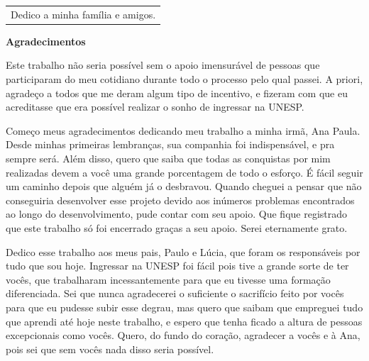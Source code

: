 \documentclass[a4paper,12pt,oneside]{report}
\begin{document}
\newpage
\thispagestyle{empty}
\vspace*{+530pt}
\hspace*{+160pt}
\begin{tabular}{p{260pt}}
  {\small Dedico a minha fam\'{i}lia e amigos.}
\end{tabular}
\newpage
\thispagestyle{empty}
\begin{center}{\LARGE \textbf{Agradecimentos}}\end{center}
\vspace{+60pt}
\hspace*{+15pt} Este trabalho n\~{a}o seria poss\'{i}vel sem o apoio imensur\'{a}vel de pessoas que participaram do meu cotidiano durante todo o processo pelo qual passei. A priori, agrade\c{c}o a todos que me deram algum tipo de incentivo, e fizeram com que eu acreditasse que era poss\'{i}vel realizar o sonho de ingressar na UNESP.
\\
\par Come\c{c}o meus agradecimentos dedicando meu trabalho a minha irm\~{a}, Ana Paula. Desde minhas primeiras lembran\c{c}as, sua companhia foi indispens\'{a}vel, e pra sempre ser\'{a}. Al\'{e}m disso, quero que saiba que todas as conquistas por mim realizadas devem a voc\^{e} uma grande porcentagem de todo o esfor\c{c}o. \'{E}  f\'{a}cil seguir um caminho depois que algu\'{e}m j\'{a} o desbravou. Quando cheguei a pensar que n\~{a}o conseguiria desenvolver esse projeto devido aos in\'{u}meros problemas encontrados ao longo do desenvolvimento, pude contar com seu apoio. Que fique registrado que este trabalho s\'{o} foi encerrado gra\c{c}as a seu apoio. Serei eternamente grato.   
\\
\par Dedico esse trabalho aos meus pais, Paulo e L\'{u}cia, que foram os respons\'{a}veis por tudo que sou hoje. Ingressar na UNESP foi f\'{a}cil pois tive a grande sorte de ter voc\^{e}s, que trabalharam incessantemente para que eu tivesse uma forma\c{c}\~{a}o di\-fe\-ren\-ciada. Sei que nunca agradecerei o suficiente o sacrif\'{i}cio feito por voc\^{e}s para que eu pudesse subir esse degrau, mas quero que saibam que empreguei tudo que aprendi at\'{e} hoje neste trabalho, e espero que tenha ficado a altura de pessoas excepcionais como voc\^{e}s. Quero, do fundo do cora\c{c}\~{a}o, agradecer a voc\^{e}s e \`{a} Ana, pois sei que sem voc\^{e}s nada disso seria poss\'{i}vel. 
\end{document}
